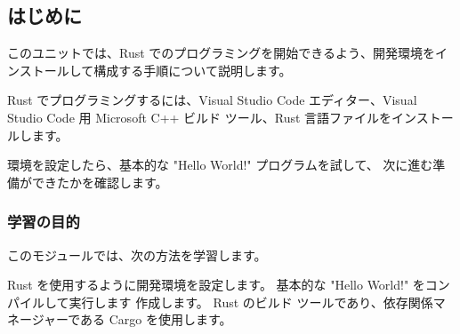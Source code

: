 \subsection{はじめに}

このユニットでは、Rust でのプログラミングを開始できるよう、開発環境をインストールして構成する手順について説明します。

Rust でプログラミングするには、Visual Studio Code エディター、Visual Studio Code 用 Microsoft C++ ビルド ツール、Rust 言語ファイルをインストールします。

環境を設定したら、基本的な "Hello World!" プログラムを試して、 次に進む準備ができたかを確認します。

\subsubsection{学習の目的}

このモジュールでは、次の方法を学習します。

\begin{itemize}
Rust を使用するように開発環境を設定します。
基本的な "Hello World!" をコンパイルして実行します 作成します。
Rust のビルド ツールであり、依存関係マネージャーである Cargo を使用します。
\end{itemize}
